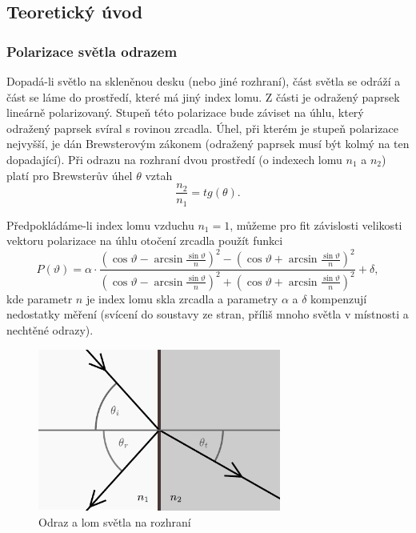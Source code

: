 \documentclass[english]{article}
\begin{document}
	\subsection{Teoretický úvod}
		
		\subsubsection{Polarizace světla odrazem}
		Dopadá-li světlo na skleněnou desku (nebo jiné rozhraní), část světla se odráží a část se láme do prostředí, které má jiný index lomu. Z části je odražený paprsek lineárně polarizovaný. Stupeň této polarizace bude záviset na úhlu, který odražený paprsek svíral s rovinou zrcadla. Úhel, při kterém je stupeň polarizace nejvyšší, je dán Brewsterovým zákonem (odražený paprsek musí být kolmý na ten dopadající). Při odrazu na rozhraní dvou prostředí (o indexech lomu $n_1$ a $n_2$) platí pro Brewsterův úhel $\theta$ vztah
		\begin{equation}
			\frac{n_2}{n_1} = tg(\theta).
			\label{eq:brewsteruv_uhel}
		\end{equation}
		
		Předpokládáme-li index lomu vzduchu $n_1 = 1$, můžeme pro fit závislosti velikosti vektoru polarizace na úhlu otočení zrcadla použít funkci 
		\begin{equation} \label{eq:brewster_fit}
		P(\vartheta) = \alpha \cdot \frac{ \left( \cos \vartheta - \arcsin \frac{\sin \vartheta}{n} \right)^2 - \left( \cos \vartheta + \arcsin \frac{\sin \vartheta}{n} \right)^2 }{ \left( \cos \vartheta - \arcsin \frac{\sin \vartheta}{n} \right)^2 + \left( \cos \vartheta + \arcsin \frac{\sin \vartheta}{n} \right)^2 } + \delta,
		\end{equation}
		kde parametr $n$ je index lomu skla zrcadla a parametry $\alpha$ a $\delta$ kompenzují nedostatky měření (svícení do soustavy ze stran, příliš mnoho světla v místnosti a nechtěné odrazy).
		
		\begin{figure}[h]
		\centering
		\includegraphics[width=8cm]{att/fresnel.pdf}
		\caption{Odraz a lom světla na rozhraní \cite{bib:slabyji2}}
		\label{fig:fresnel}
		\end{figure}
		
\end{document}
